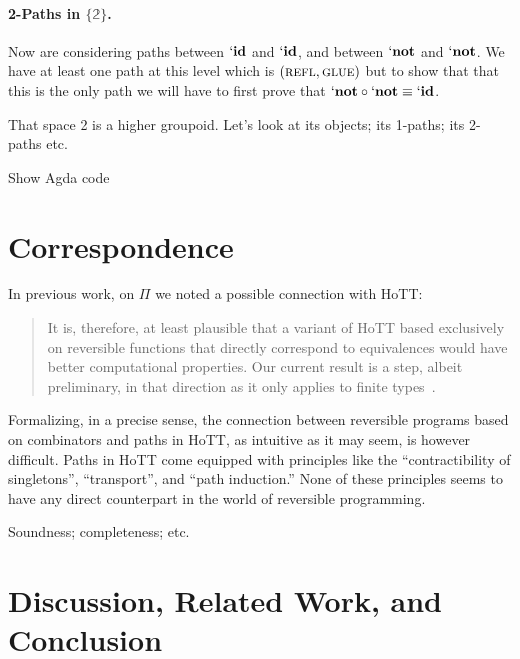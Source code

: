 \documentclass{entcs}
\newcommand{\reflp}{\textsc{refl}}
\newcommand{\gluep}{\textsc{glue}}
\newcommand{\bt}{\mathbb{2}}
\begin{document}
\paragraph*{2-Paths in $\{\bt\}$.} Now are considering paths between
$`\mathbf{id}$ and $`\mathbf{id}$, and between $`\mathbf{not}$ and
$`\mathbf{not}$. We have at least one path at this level which is
$(\reflp,\gluep)$ but to show that that this is the only path we will have to
first prove that $`\mathbf{not} \circ `\mathbf{not} \equiv `\mathbf{id}$.

That space {2} is a higher groupoid. Let's look at its objects; its 1-paths; its
2-paths etc.

Show Agda code

\section{Correspondence}
\label{sec:connection}

In previous work, on $\Pi$ we noted a possible connection with HoTT:
\begin{quote}
  It is, therefore, at least plausible that a variant of HoTT based exclusively
  on reversible functions that directly correspond to equivalences would have
  better computational properties. Our current result is a step, albeit
  preliminary, in that direction as it only applies to finite
  types~\cite{Carette2016}.
\end{quote}
Formalizing, in a precise sense, the connection between reversible programs
based on combinators and paths in HoTT, as intuitive as it may seem, is however
difficult. Paths in HoTT come equipped with principles like the
``contractibility of singletons'', ``transport'', and ``path induction.'' None
of these principles seems to have any direct counterpart in the world of
reversible programming.

Soundness; completeness; etc.


\section{Discussion, Related Work, and Conclusion}
\label{sec:conclusion}
\end{document}
